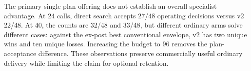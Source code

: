 The primary single-plan offering does not establish an overall specialist advantage. At 24 calls, direct search accepts 27/48 operating decisions versus v2 22/48. At 40, the counts are 32/48 and 33/48, but different ordinary arms solve different cases: against the ex-post best conventional envelope, v2 has two unique wins and ten unique losses. Increasing the budget to 96 removes the plan-acceptance difference. These observations preserve commercially useful ordinary delivery while limiting the claim for optional retention.
